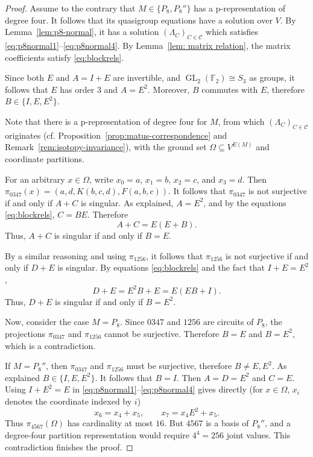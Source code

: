 \documentclass[preprint,12pt]{elsarticle}
\theoremstyle{definition}
\newcommand{\F}{\mathbb F}
\newcommand{\GL}{\operatorname{GL}}
\begin{document}
\begin{proof}

Assume to the contrary that $M \in \{P_8,P_8''\}$ has a p-representation of degree
four. It follows that its quasigroup equations have a solution over $V$. By
Lemma~\ref{lem:p8-normal}, it has a solution $(\Lambda_C)_{C \in \mathcal{C}}$ which
satisfies \eqref{eq:p8normal1}--\eqref{eq:p8normal4}. By Lemma~\ref{lem: matrix relation}, the matrix coefficients satisfy \eqref{eq:blockrels}. 

Since both $E$ and $A = I+E$ are invertible, and $\GL_2(\F_2) \cong S_3$ as groups,
it follows that $E$ has order $3$ and $A = E^2$. Moreover, $B$ commutes with $E$, therefore $B \in \{I,E,E^2\}$.

Note that there is a p-representation of degree four for $M$, from which $(\Lambda_C)_{C \in \mathcal{C}}$ originates (cf. Proposition~\ref{prop:matus-correspondence} and Remark~\ref{rem:isotopy-invariance}), with the ground set $\Omega \subseteq V^{E(M)}$ and
coordinate partitions.

For an arbitrary $x \in \Omega$, write $x_0=a$, $x_1=b$,
$x_2=c$, and $x_3=d$. Then
$\pi_{0347}(x)=(a,d,K(b,c,d),F(a,b,c))$. It follows that
$\pi_{0347}$ is not surjective if and only if $A+C$ is singular. As explained, $A = E^2$, and by the equations \eqref{eq:blockrels}, $C = BE$. Therefore
\[
A + C = E(E+B).
\]
Thus, $A+C$ is singular if and only if $B = E$.

By a similar reasoning and using $\pi_{1256}$, it follows that $\pi_{1256}$ is not
surjective if and only if $D+E$ is singular. By equations \eqref{eq:blockrels} and the fact that $I + E =E^2$,
\[
D + E = E^2B + E=E( EB + I).
\]
Thus, $D + E$ is singular if and only if $B = E^2$.

Now, consider the case $M = P_8$. Since $0347$ and $1256$ are circuits of 
$P_8$, the projections $\pi_{0347}$ and $\pi_{1256}$ cannot be surjective. Therefore 
$B= E$ and $B= E^2$, which is a contradiction.

If $M = P_8''$, then $\pi_{0347}$ and $\pi_{1256}$ must be surjective, therefore 
$B \neq E,E^2$. As explained $B \in \{I,E,E^2\}$. It follows that $B = I$. Then
$A=D=E^2$ and $C=E$. Using $I+E^2=E$ in
\eqref{eq:p8normal1}--\eqref{eq:p8normal4} gives directly (for
$x\in\Omega$, $x_i$ denotes the coordinate indexed by $i$)
\[
x_6=x_4+x_5,
\qquad
x_7=x_4E^2+x_5.
\]
Thus $\pi_{4567}(\Omega)$ has cardinality at most $16$. But $4567$ is a basis of $P_8''$, and a degree-four partition representation would require $4^4=256$ joint values. This contradiction finishes the proof.
\end{proof}
\end{document}
